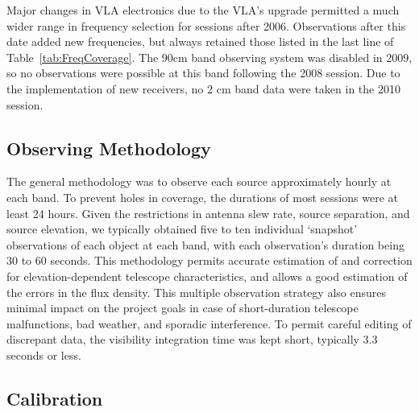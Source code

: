 \documentclass{aastex}
\begin{document}
Major changes in VLA electronics due to the VLA's upgrade permitted a
much wider range in frequency selection for sessions after 2006.
Observations after this date added new frequencies, but always
retained those listed in the last line of
Table~\ref{tab:FreqCoverage}.  The 90cm band observing system was
disabled in 2009, so no observations were possible at this band
following the 2008 session.  Due to the implementation of new
receivers, no 2 cm band data were taken in the 2010 session.

\subsection{Observing Methodology}

The general methodology was to observe each source approximately
hourly at each band.  To prevent holes in coverage, the durations of
most sessions were at least 24 hours.  Given the restrictions in
antenna slew rate, source separation, and source elevation, we
typically obtained five to ten individual `snapshot' observations of
each object at each band, with each observation's duration being 30 to
60 seconds.  This methodology permits accurate estimation of and
correction for elevation-dependent telescope characteristics, and
allows a good estimation of the errors in the flux density.  This
multiple observation strategy also ensures minimal impact on the
project goals in case of short-duration telescope malfunctions, bad
weather, and sporadic interference.  To permit careful editing of
discrepant data, the visibility integration time was kept short,
typically 3.3 seconds or less.

\subsection{Calibration}
\end{document}
